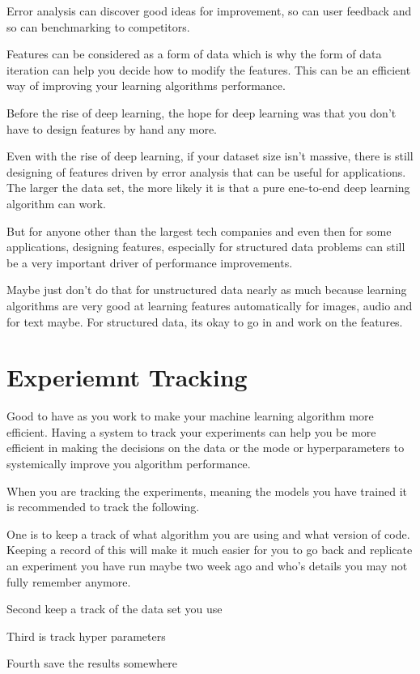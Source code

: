 Error analysis can discover good ideas for improvement, so can user feedback and so can benchmarking to competitors.

Features can be considered as a form of data which is why the form of data iteration can help you decide how to modify the features.
This can be an efficient way of improving your learning algorithms performance.

Before the rise of deep learning, the hope for deep learning was that you don't have to design features by hand any more.

Even with the rise of deep learning, if your dataset size isn't massive, there is still designing of features driven by error analysis that can be useful for applications.
The larger the data set, the more likely it is that a pure ene-to-end deep learning algorithm can work.

But for anyone other than the largest tech companies and even then for some applications, designing features, especially for structured data problems can still be a very important driver of performance improvements.

Maybe just don't do that for unstructured data nearly as much because learning algorithms are very good at learning features automatically for images, audio and for text maybe.
For structured data, its okay to go in and work on the features.

\section{Experiemnt Tracking}

Good to have as you work to make your machine learning algorithm more efficient.
Having a system to track your experiments can help you be more efficient in making the decisions on the data or the mode or hyperparameters to systemically improve you algorithm performance.


When you are tracking the experiments, meaning the models you have trained it is recommended to track the following.

One is to keep a track of what algorithm you are using and what version of code.
Keeping a record of this will make it much easier for you to go back and replicate an experiment you have run maybe two week ago and who's details you may not fully remember anymore.

Second keep a track of the data set you use

Third is track hyper parameters

Fourth save the results somewhere

